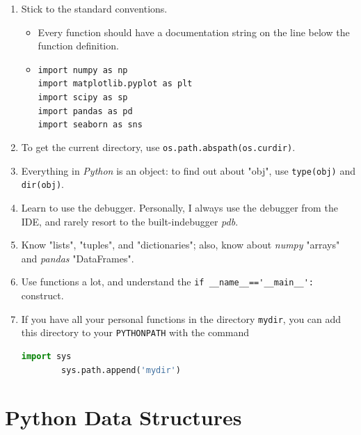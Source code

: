 \begin{enumerate}
  \item Stick to the standard conventions.
      \begin{itemize}
        \item Every function should have a documentation string on the line below the function definition.
        \item \lstinline{import numpy as np}\\
            \lstinline{import matplotlib.pyplot as plt}\\
            \lstinline{import scipy as sp}\\
            \lstinline{import pandas as pd}\\
            \lstinline{import seaborn as sns}
      \end{itemize}
  \item To get the current directory, use \lstinline{os.path.abspath(os.curdir)}.
  \item Everything in \emph{Python} is an object: to find out about "obj", use \lstinline{type(obj)} and \lstinline{dir(obj)}.
  \item Learn to use the debugger. Personally, I always use the debugger from the IDE, and rarely resort to the built-indebugger \emph{pdb}.
  \item Know "lists", "tuples", and "dictionaries"; also, know about \emph{numpy} "arrays" and \emph{pandas} "DataFrames".
  \item Use functions a lot, and understand the \lstinline{if __name__=='__main__':} construct.
  \item If you have all your personal functions in the directory \lstinline{mydir}, you can add this directory to your \lstinline{PYTHONPATH} with the command
      \begin{lstlisting}[language=Python]
        import sys
        sys.path.append('mydir')
      \end{lstlisting}
\end{enumerate}

\section{Python Data Structures}

